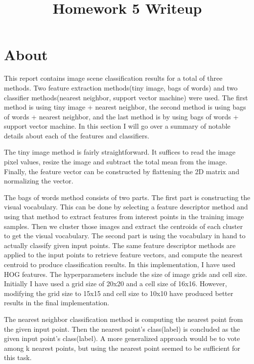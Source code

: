 \date{}

\title{\vspace{-1cm}Homework 5 Writeup}



\maketitle
\vspace{-3cm}
\thispagestyle{fancy}

\section*{About} This report contains image scene classification results for a total of three methods. Two feature extraction methods(tiny image, bags of words) and two classifier methods(nearest neighbor, support vector machine) were used. The first method is using tiny image + nearest neighbor, the second method is using bags of words + nearest neighbor, and the last method is by using bags of words + support vector machine. In this section I will go over a summary of notable details about each of the features and classifiers.

The tiny image method is fairly straightforward. It suffices to read the image pixel values, resize the image and subtract the total mean from the image. Finally, the feature vector can be constructed by flattening the 2D matrix and normalizing the vector.

The bags of words method consists of two parts. The first part is constructing the visual vocabulary. This can be done by selecting a feature descriptor method and using that method to extract features from interest points in the training image samples. Then we cluster those images and extract the centroids of each cluster to get the visual vocabulary. The second part is using the vocabulary in hand to actually classify given input points. The same feature descriptor methods are applied to the input points to retrieve feature vectors, and compute the nearest centroid to produce classification results. In this implementation, I have used HOG features. The hyperparameters include the size of image grids and cell size. Initially I have used a grid size of 20x20 and a cell size of 16x16. However, modifying the grid size to 15x15 and cell size to 10x10 have produced better results in the final implementation.

The nearest neighbor classification method is computing the nearest point from the given input point. Then the nearest point's class(label) is concluded as the given input point's class(label). A more generalized approach would be to vote among k nearest points, but using the nearest point seemed to be sufficient for this task.

